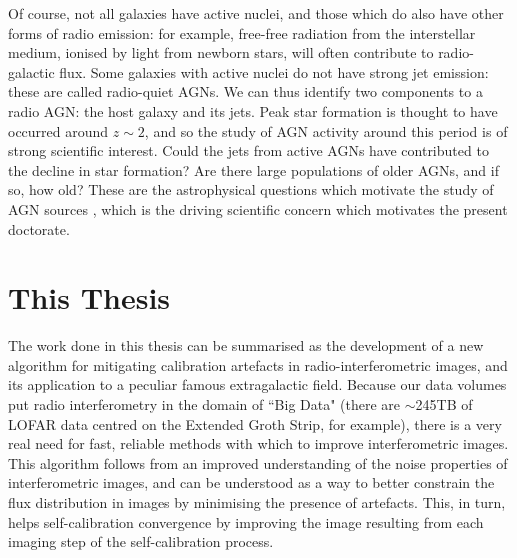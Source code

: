 \pg
Of course, not all galaxies have active nuclei, and those which do also have other forms of radio emission: for example, free-free radiation from the interstellar medium, ionised by light from newborn stars, will often contribute to radio-galactic flux. Some galaxies with active nuclei do not have strong jet emission: these are called radio-quiet AGNs. We can thus identify two components to a radio AGN: the host galaxy and its jets. Peak star formation is thought to have occurred around $z\sim2$, and so the study of AGN activity around this period is of strong scientific interest. Could the jets from active AGNs have contributed to the decline in star formation? Are there large populations of older AGNs, and if so, how old? These are the astrophysical questions which motivate the study of AGN sources , which is the driving scientific concern which motivates the present doctorate.
%
%




\clearpage



\clearpage


\clearpage
\section{This Thesis}

\pg
The work done in this thesis can be summarised as the development of a new algorithm for mitigating calibration artefacts in radio-interferometric images, and its application to a peculiar famous extragalactic field. Because our data volumes put radio interferometry in the domain of ``Big Data" (there are $\sim$245TB of LOFAR data centred on the Extended Groth Strip, for example), there is a very real need for fast, reliable methods with which to improve interferometric images. This algorithm follows from an improved understanding of the noise properties of interferometric images, and can be understood as a way to better constrain the flux distribution in images by minimising the presence of artefacts. This, in turn, helps self-calibration convergence by improving the image resulting from each imaging step of the self-calibration process. 

